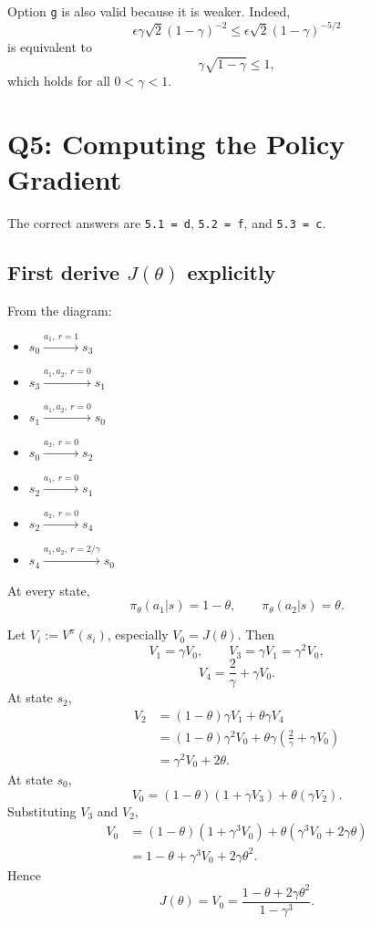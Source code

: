\documentclass[11pt]{article}
\newcommand{\1}{\mathbf{1}}
\newcommand{\eps}{\epsilon}
\begin{document}
Option \texttt{g} is also valid because it is weaker. Indeed,
\[
\eps\gamma\sqrt{2}(1-\gamma)^{-2}
\le
\eps\sqrt{2}(1-\gamma)^{-5/2}
\]
is equivalent to
\[
\gamma\sqrt{1-\gamma}\le 1,
\]
which holds for all $0<\gamma<1$.

\section{Q5: Computing the Policy Gradient}
The correct answers are \texttt{5.1 = d}, \texttt{5.2 = f}, and \texttt{5.3 = c}.

\subsection*{First derive $J(\theta)$ explicitly}
From the diagram:
\begin{itemize}[leftmargin=2em]
\item $s_0 \xrightarrow{a_1,\ r=1} s_3$
\item $s_3 \xrightarrow{a_1,a_2,\ r=0} s_1$
\item $s_1 \xrightarrow{a_1,a_2,\ r=0} s_0$
\item $s_0 \xrightarrow{a_2,\ r=0} s_2$
\item $s_2 \xrightarrow{a_1,\ r=0} s_1$
\item $s_2 \xrightarrow{a_2,\ r=0} s_4$
\item $s_4 \xrightarrow{a_1,a_2,\ r=2/\gamma} s_0$
\end{itemize}
At every state,
\[
\pi_\theta(a_1|s)=1-\theta,\qquad \pi_\theta(a_2|s)=\theta.
\]

Let $V_i:=V^\pi(s_i)$, especially $V_0=J(\theta)$. Then
\[
V_1=\gamma V_0,\qquad
V_3=\gamma V_1=\gamma^2 V_0,
\]
\[
V_4=\frac{2}{\gamma}+\gamma V_0.
\]
At state $s_2$,
\[
\begin{aligned}
V_2
&=(1-\theta)\gamma V_1+\theta \gamma V_4 \\
&=(1-\theta)\gamma^2V_0+\theta\gamma\left(\frac{2}{\gamma}+\gamma V_0\right) \\
&=\gamma^2V_0+2\theta.
\end{aligned}
\]
At state $s_0$,
\[
V_0=(1-\theta)(1+\gamma V_3)+\theta(\gamma V_2).
\]
Substituting $V_3$ and $V_2$,
\[
\begin{aligned}
V_0
&=(1-\theta)(1+\gamma^3V_0)+\theta(\gamma^3V_0+2\gamma\theta) \\
&=1-\theta+\gamma^3V_0+2\gamma\theta^2.
\end{aligned}
\]
Hence
\[
J(\theta)=V_0=\frac{1-\theta+2\gamma\theta^2}{1-\gamma^3}.
\]
\end{document}
